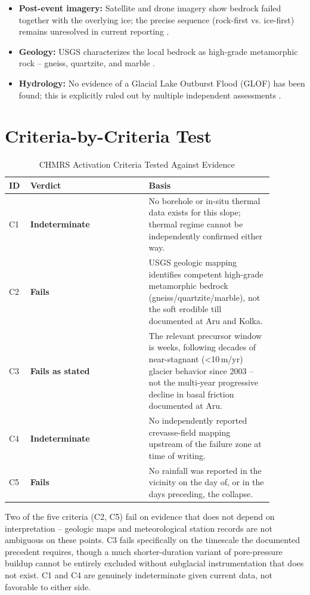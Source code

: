 \documentclass[11pt,twocolumn]{article}
\begin{document}
\begin{itemize}
\item \textbf{Post-event imagery:} Satellite and drone imagery show bedrock failed together with the overlying ice; the precise sequence (rock-first vs. ice-first) remains unresolved in current reporting \cite{phys2026,pttl2026}.
\item \textbf{Geology:} USGS characterizes the local bedrock as high-grade metamorphic rock -- gneiss, quartzite, and marble \cite{geoscopy2026}.
\item \textbf{Hydrology:} No evidence of a Glacial Lake Outburst Flood (GLOF) has been found; this is explicitly ruled out by multiple independent assessments \cite{antarcticglaciers2026,unda2026}.
\end{itemize}

\section{Criteria-by-Criteria Test}

\begin{table}[h]
\centering
\caption{CHMRS Activation Criteria Tested Against Evidence}
\small
\begin{tabular}{p{0.06\linewidth}p{0.4\linewidth}p{0.42\linewidth}}
\toprule
\textbf{ID} & \textbf{Verdict} & \textbf{Basis} \\
\midrule
C1 & \textbf{Indeterminate} & No borehole or in-situ thermal data exists for this slope; thermal regime cannot be independently confirmed either way. \\
C2 & \textbf{Fails} & USGS geologic mapping identifies competent high-grade metamorphic bedrock (gneiss/quartzite/marble), not the soft erodible till documented at Aru and Kolka. \\
C3 & \textbf{Fails as stated} & The relevant precursor window is weeks, following decades of near-stagnant (\textless10\,m/yr) glacier behavior since 2003 -- not the multi-year progressive decline in basal friction documented at Aru. \\
C4 & \textbf{Indeterminate} & No independently reported crevasse-field mapping upstream of the failure zone at time of writing. \\
C5 & \textbf{Fails} & No rainfall was reported in the vicinity on the day of, or in the days preceding, the collapse. \\
\bottomrule
\end{tabular}
\end{table}

Two of the five criteria (C2, C5) fail on evidence that does not depend on interpretation -- geologic maps and meteorological station records are not ambiguous on these points. C3 fails specifically on the timescale the documented precedent requires, though a much shorter-duration variant of pore-pressure buildup cannot be entirely excluded without subglacial instrumentation that does not exist. C1 and C4 are genuinely indeterminate given current data, not favorable to either side.
\end{document}
